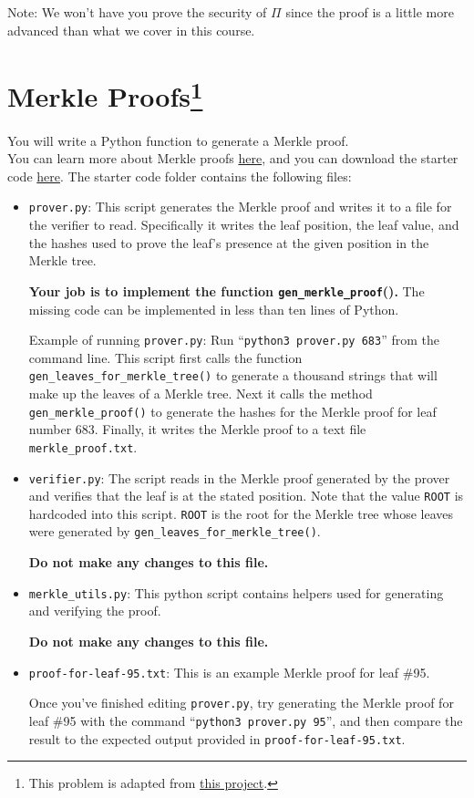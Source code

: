 \documentclass[11pt]{article}
\numberwithin{equation}{section}
\begin{document}
Note: We won't have you prove the security of $\Pi$ since the proof is a little more advanced than what we cover in this course. 
\pagebreak


\section{Merkle Proofs\footnote{This problem is adapted from \href{https://cs251.stanford.edu/hw/proj1.pdf}{this project}.}}
You will write a Python function to generate a Merkle proof.\\ 

\noindent You can learn more about Merkle proofs \href{https://decentralizedthoughts.github.io/2020-12-22-what-is-a-merkle-tree/}{here}, and you can download the starter code \href{https://eecs171.com/assets/homework/hw9.zip}{here}. The starter code folder contains the following files:
\begin{itemize}
    \item \texttt{prover.py}: This script generates the Merkle proof and writes it to a file for the verifier to read. Specifically it writes the leaf position, the leaf value, and the hashes used to prove the leaf’s presence at the given position in the Merkle tree.

    \textbf{Your job is to implement the function \texttt{gen\_merkle\_proof}().} The missing code can be implemented in less than ten lines of Python.

    Example of running \texttt{prover.py}: Run ``\texttt{python3 prover.py 683}'' from the command line. This script first calls the function \texttt{gen\_leaves\_for\_merkle\_tree()} to generate a thousand strings that will make up the leaves of a Merkle tree. Next it calls the method \texttt{gen\_merkle\_proof()} to generate the hashes for the Merkle proof for leaf number 683. Finally, it writes the Merkle proof to a text file \texttt{merkle\_proof.txt}.

    \item \texttt{verifier.py}: The script reads in the Merkle proof generated by the prover and verifies that the leaf is at the stated position. Note that the value \texttt{ROOT} is hardcoded into this script. \texttt{ROOT} is the root for the Merkle tree whose leaves were generated by \texttt{gen\_leaves\_for\_merkle\_tree()}.
    
    \textbf{Do not make any changes to this file.} 
    
    \item \texttt{merkle\_utils.py}: This python script contains helpers used for generating and verifying the proof. 
    
    \textbf{Do not make any changes to this file.}

    \item \texttt{proof-for-leaf-95.txt}: This is an example Merkle proof for leaf \#95. 
    
    Once you've finished editing \texttt{prover.py}, try generating the Merkle proof for leaf \#95 with the command ``\texttt{python3 prover.py 95}'', and then compare the result to the expected output provided in \texttt{proof-for-leaf-95.txt}.
\end{itemize}
\end{document}
